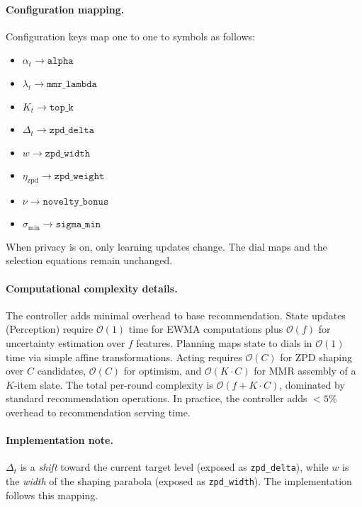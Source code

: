 \paragraph{Configuration mapping.} Configuration keys map one to one to symbols as follows:
\begin{itemize}
\item \(\alpha_t \rightarrow \texttt{alpha}\)
\item \(\lambda_t \rightarrow \texttt{mmr\_lambda}\) 
\item \(K_t \rightarrow \texttt{top\_k}\)
\item \(\Delta_t \rightarrow \texttt{zpd\_delta}\)
\item \(w \rightarrow \texttt{zpd\_width}\)
\item \(\eta_{\mathrm{zpd}} \rightarrow \texttt{zpd\_weight}\)
\item \(\nu \rightarrow \texttt{novelty\_bonus}\)
\item \(\sigma_{\min} \rightarrow \texttt{sigma\_min}\)
\end{itemize}

When privacy is on, only learning updates change. The dial maps and the selection equations remain unchanged.

\paragraph{Computational complexity details.} The controller adds minimal overhead to base recommendation. State updates (Perception) require $\mathcal{O}(1)$ time for EWMA computations plus $\mathcal{O}(f)$ for uncertainty estimation over $f$ features. Planning maps state to dials in $\mathcal{O}(1)$ time via simple affine transformations. Acting requires $\mathcal{O}(C)$ for ZPD shaping over $C$ candidates, $\mathcal{O}(C)$ for optimism, and $\mathcal{O}(K \cdot C)$ for MMR assembly of a $K$-item slate. The total per-round complexity is $\mathcal{O}(f + K \cdot C)$, dominated by standard recommendation operations. In practice, the controller adds $<5\%$ overhead to recommendation serving time.

\paragraph{Implementation note.} \(\Delta_t\) is a \emph{shift} toward the current target level (exposed as \texttt{zpd\_delta}), while \(w\) is the \emph{width} of the shaping parabola (exposed as \texttt{zpd\_width}). The implementation follows this mapping.


